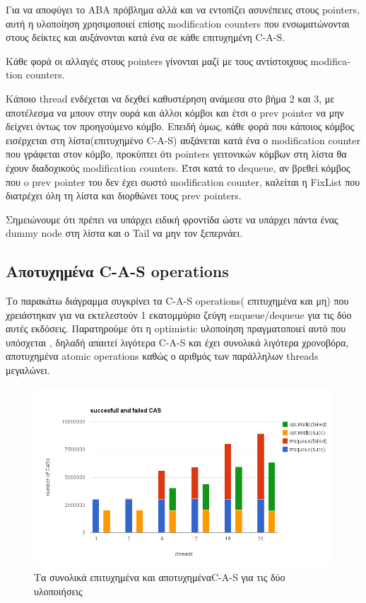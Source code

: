 Για να αποφύγει το ABA πρόβλημα αλλά και να εντοπίζει ασυνέπειες στους pointers, αυτή η υλοποίηση χρησιμοποιεί επίσης \textlatin{modification counters} που ενσωματώνονται στους δείκτες και αυξάνονται κατά ένα σε κάθε επιτυχημένη \textlatin{C-A-S}.

Κάθε φορά οι αλλαγές στους \textlatin{pointers} γίνονται μαζί με τους αντίστοιχους \textlatin{modification counters}.


Κάποιο \textlatin{thread} ενδέχεται να δεχθεί καθυστέρηση ανάμεσα στο βήμα 2 και 3, με αποτέλεσμα να μπουν στην  ουρά και άλλοι κόμβοι και έτσι ο \textlatin{prev pointer} να μην δείχνει όντως τον προηγούμενο κόμβο. Επειδή όμως, κάθε  φορά που κάποιος κόμβος εισέρχεται στη λίστα(επιτυχημένο \textlatin{C-A-S}) αυξάνεται κατά ένα ο \textlatin{modification counter} που γράφεται στον κόμβο, προκύπτει ότι \textlatin{pointers} γειτονικών κόμβων στη λίστα θα έχουν διαδοχικούς \textlatin{modification counters}. Έτσι κατά το \textlatin{dequeue}, αν βρεθεί κόμβος που o \textlatin{prev pointer} του δεν έχει σωστό \textlatin{modification counter}, καλείται η \textlatin{FixList} που διατρέχει όλη τη λίστα και διορθώνει τους \textlatin{prev pointers}.

Σημειώνουμε ότι πρέπει να υπάρχει ειδική φροντίδα ώστε να υπάρχει πάντα ένας \textlatin{dummy node} στη λίστα και ο \textlatin{Tail}  να μην τον ξεπερνάει.

\subsection{Αποτυχημένα \textlatin{C-A-S operations}} 
Το παρακάτω διάγραμμα συγκρίνει τα \textlatin{C-A-S operations}( επιτυχημένα και μη) που χρειάστηκαν για να εκτελεστούν 1 εκατομμύριο ζεύγη \textlatin{enqueue/dequeue} για τις δύο αυτές εκδόσεις. Παρατηρούμε ότι η \textlatin{optimistic} υλοποίηση πραγματοποιεί αυτό που υπόσχεται , δηλαδή απαιτεί λιγότερα \textlatin{C-A-S}  και έχει συνολικά λιγότερα χρονοβόρα, αποτυχημένα \textlatin{atomic operations} καθώς ο αριθμός των παράλληλων \textlatin{threads} μεγαλώνει.

\begin{figure}
 \centering
  \includegraphics[scale=0.5]{failed_cas.png}
\caption{Τα συνολικά επιτυχημένα και αποτυχημένα\textlatin{C-A-S} για τις δύο υλοποιήσεις}
\end{figure}

